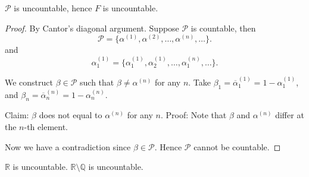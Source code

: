 \begin{theorem}[Cantor]
	$\mathcal{P}$ is uncountable, hence $F$ is uncountable.
\end{theorem}
\begin{proof}
	By Cantor's diagonal argument.
	Suppose $\mathcal{P}$ is countable, then \[
		\mathcal{P} = \{\alpha^{(1)}, \alpha^{(2)}, \ldots,\alpha^{(n)},\ldots \} 
	.\] 
	and \[
		\alpha_1^{(1)} = \{\alpha_1^{(1)}, \alpha_2^{(1)}, \ldots,\alpha_1^{(n)},\ldots \} 
	.\] 

	We construct $\beta \in \mathcal{P}$ such that $\beta \neq  \alpha^{(n)}$ for any $n$.
	Take $\beta_1 = \overline \alpha_1^{(1)} = 1- \alpha_1^{(1)}$, and $\beta_n = \overline \alpha_n^{(n)} = 1- \alpha_n^{(n)}$.

	Claim: $\beta$ does not equal to $\alpha^{(n)}$ for any $n$. Proof: Note that $\beta$ and $\alpha^{(n)}$ differ at the $n$-th element. 

	Now we have a contradiction since $\beta \in \mathcal{P}$. Hence $\mathcal{P}$ cannot be countable.
\end{proof}

\begin{corollary}
	$\mathbb{R}$ is uncountable. $\mathbb{R}\setminus \mathbb{Q}$ is uncountable.
\end{corollary}
